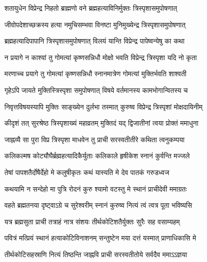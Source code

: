 \twolineshloka
{शतायुधेन विप्रेन्द्र निहतो ब्राह्मणो वने}
{ब्रह्महत्याविनिर्मुक्तः त्रिस्पृशासमुपोषणात्}%

\twolineshloka
{जीवोपदेशाच्छक्रस्य हत्या नमुचिसम्भवा}
{विनष्टा मुनिमुख्येन्द्र त्रिस्पृशासमुपोषणात्}%

\twolineshloka
{ब्रह्महत्यादिपापानि त्रिस्पृशासमुपोषणात्}
{विलयं यान्ति विप्रेन्द्र पापेष्वन्येषु का कथा}%

\twolineshloka
{न प्रयागे न काश्यां तु गोमत्यां कृष्णसन्निधौ}
{मोक्षो भवति विप्रेन्द्र त्रिस्पृशा यदि नो कृता}%

\twolineshloka
{मरणाच्च प्रयागे तु गोमत्यां कृष्णसन्निधौ}
{स्नानमात्रेण गोमत्यां मुक्तिर्भवति शाश्वती}%

\twolineshloka
{गृहेऽपि जायते मुक्तिस्त्रिस्पृशा समुपोषणात्}
{विषये वर्तमानस्य कामभोगान्वितस्य च}%

\twolineshloka
{निवृत्तविषयस्यापि मुक्तिः साङ्ख्येन दुर्लभा}
{तस्मात् कुरुष्व विप्रेन्द्र त्रिस्पृशां मोक्षदायिनीम्}%


\twolineshloka
{कीदृशं तत् सुरश्रेष्ठ त्रिस्पृशाख्यं महाव्रतम्}
{मुक्तिदं यद् द्विजातीनां त्वया प्रोक्तं ममाधुना}%


\twolineshloka
{जाह्नव्यै सा पुरा विप्र त्रिस्पृशा माधवेन तु}
{प्राची सरस्वतीतीरे कथिता त्वनुकम्पया}%


\twolineshloka
{कलिकल्मष कोट्यौघैर्ब्रह्महत्यादिकैर्युताः}
{कलिकाले हृषीकेश स्नानं कुर्वन्ति मज्जले}%

\twolineshloka
{तेषां पापशतैर्दोषैर्देहो मे कलुषीकृतः}
{कथं यास्यति मे देव पातकं गरुडध्वज}%


\twolineshloka
{कथयामि न सन्देहो मा पुत्रि रोदनं कुरु}
{श्यामो वटस्तु मे स्थानं प्राचीदेवी ममाग्रतः}%

\twolineshloka
{वहते ब्रह्मतनया दृष्ट्वाऽग्रे च सुरेश्वरीम्}
{स्नानं कुरुष्व नित्यं त्वं त्वत्र पूता भविष्यसि}%

\twolineshloka
{यत्र ब्रह्मसुता प्राची तत्राहं नात्र संशयः}
{तीर्थकोटिशतैर्युक्तः सुरैः सह वसाम्यहम्}%

\twolineshloka
{पवित्रं मत्प्रियं स्थानं हत्याकोटिविनाशनम्}
{सन्तुष्टेन मया दत्तं यस्मात् प्राणाधिकासि मे}%

\twolineshloka
{तीर्थकोटिसहस्राणि नित्यं तिष्ठन्ति जाह्नवि}
{प्राची सरस्वतीतोये सर्वदैव ममाऽऽज्ञया}%

